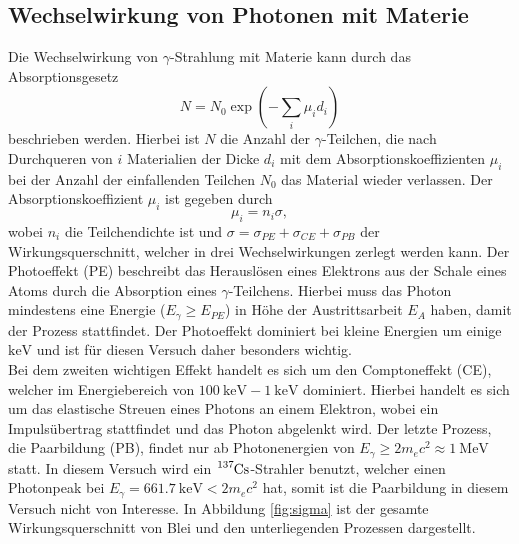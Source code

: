 \subsection{Wechselwirkung von Photonen mit Materie}
Die Wechselwirkung von $\gamma$-Strahlung mit Materie kann durch das Absorptionsgesetz 
\begin{equation}
    \label{eqn:Absorb}
    N = N_0 \exp(-\sum_i \mu_i d_i )
\end{equation}
beschrieben werden.
Hierbei ist $N$ die Anzahl der $\gamma$-Teilchen, die nach Durchqueren von $i$ Materialien der Dicke $d_i$ mit dem Absorptionskoeffizienten $\mu_i$ bei 
der Anzahl der einfallenden Teilchen $N_0$ das Material wieder verlassen.
Der Absorptionskoeffizient $\mu_i$ ist gegeben durch
\begin{equation}
    \mu_i = n_i \sigma,
\end{equation}
wobei $n_i$ die Teilchendichte ist und $\sigma = \sigma_{PE} + \sigma_{CE} + \sigma_{PB}$ der Wirkungsquerschnitt, welcher in drei Wechselwirkungen zerlegt werden kann.
Der Photoeffekt (PE) beschreibt das Herauslösen eines Elektrons aus der Schale eines Atoms durch die Absorption eines $\gamma$-Teilchens. Hierbei muss das Photon mindestens eine Energie ($E_{\gamma} \geq E_{PE}$) in Höhe der Austrittsarbeit $E_{A}$ haben, damit der Prozess stattfindet.
Der Photoeffekt dominiert bei kleine Energien um einige $\si{\keV}$ und ist für diesen Versuch daher besonders wichtig.\\
Bei dem zweiten wichtigen Effekt handelt es sich um den Comptoneffekt (CE), welcher im Energiebereich von $\SI{100}{\keV}- \SI{1}{\keV}$ dominiert.
Hierbei handelt es sich um das elastische Streuen eines Photons an einem Elektron, wobei ein Impulsübertrag stattfindet und das Photon abgelenkt wird.
Der letzte Prozess, die Paarbildung (PB), findet nur ab Photonenergien von $E_{\gamma} \geq 2 m_e c^2 \approx \SI{1}{\MeV}$ statt.
In diesem Versuch wird ein $\ce{^{137}Cs}$-Strahler benutzt, welcher einen Photonpeak bei $E_{\gamma} = \SI{661.7}{\keV} < 2 m_e c^2$ hat, somit ist die Paarbildung in diesem Versuch nicht von Interesse.
In Abbildung \ref{fig:sigma} ist der gesamte Wirkungsquerschnitt von Blei und den unterliegenden Prozessen dargestellt.
